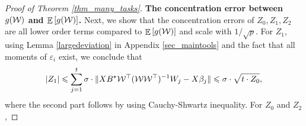 \begin{proof}[Proof of Theorem \ref{thm_many_tasks}]
	\medskip
	\noindent\textbf{The concentration error between $g({\mathcal W})$ and $\mathop{\mathbb{E}}\left[ g({\mathcal W}) \right]$.}
	Next, we show that the concentration errors of $Z_0, Z_1, Z_2$ are all lower order terms compared to $\mathop{\mathbb{E}}\left[ g({\mathcal W}) \right]$ and scale with $1/\sqrt{p}$.
	For $Z_1$, using Lemma \ref{largedeviation} in Appendix \ref{sec_maintools} and the fact that all moments of $\varepsilon_i$ exist, we conclude that
	\[ \left\lvert Z_1\right\rvert \leqslant \sum_{j=1}^t \sigma \cdot \|X B^{\star} {\mathcal W}^{\top} ({\mathcal W}{\mathcal W}^{\top})^{-1} W_j - X \beta_j\| \leqslant \sigma \cdot \sqrt{t \cdot Z_0}, \]
	where the second part follows by using Cauchy-Shwartz inequality.
	For $Z_0$ and $Z_2$, 



\end{proof}
